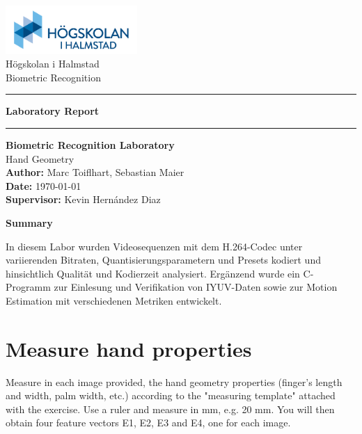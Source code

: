 \documentclass[a4paper,12pt]{article}
\begin{document}
\begin{titlepage}
    \centering
    \includegraphics[width=5cm]{Resources/hogskolan-halmstad-logo.png} \\[0.5cm] %
    Högskolan i Halmstad \\[0.2cm]
    Biometric Recognition \\[1.5cm]
    
    \hrule
    \vspace{0.4cm} %
    {\LARGE \textbf{Laboratory Report}}
    \vspace{0.4cm}
    \hrule
    \vspace{1.5cm} %

    {\Large \textbf{Biometric Recognition Laboratory}} \\[0.2cm]
    {\Large Hand Geometry} \\[1cm]
    
    \textbf{Author:} Marc Toiflhart, Sebastian Maier \\[0.2cm]
    \textbf{Date:} \today \\[0.2cm]
    \textbf{Supervisor:} Kevin Hernández Diaz

    \vfill
\end{titlepage}
\newpage

\begin{center}
    \textbf{Summary}
\end{center}
In diesem Labor wurden Videosequenzen mit dem H.264-Codec unter variierenden Bitraten, Quantisierungsparametern und Presets kodiert und hinsichtlich Qualität und Kodierzeit analysiert. Ergänzend wurde ein C-Programm zur Einlesung und Verifikation von IYUV-Daten sowie zur Motion Estimation mit verschiedenen Metriken entwickelt.

\newpage
\section{Measure hand properties}
Measure in each image provided, the hand geometry properties (finger’s length and width, palm width, etc.) according to the "measuring template" attached with the exercise. Use a ruler and measure in mm, e.g. 20 mm. You will then obtain four feature vectors E1, E2, E3 and E4, one for each image.
\end{document}
